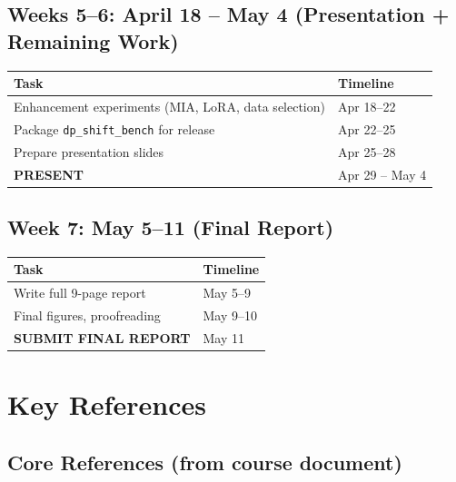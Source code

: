 \documentclass[11pt,a4paper]{article}
\begin{document}
\subsection{Weeks 5--6: April 18 -- May 4 (Presentation + Remaining Work)}

\begin{small}
\begin{longtable}{@{}p{7cm}p{5cm}@{}}
\toprule
\textbf{Task} & \textbf{Timeline} \\
\midrule
\endhead
Enhancement experiments (MIA, LoRA, data selection) & Apr 18--22 \\
Package \texttt{dp\_shift\_bench} for release & Apr 22--25 \\
Prepare presentation slides & Apr 25--28 \\
\textbf{PRESENT} & Apr 29 -- May 4 \\
\bottomrule
\end{longtable}
\end{small}

\subsection{Week 7: May 5--11 (Final Report)}

\begin{small}
\begin{longtable}{@{}p{7cm}p{5cm}@{}}
\toprule
\textbf{Task} & \textbf{Timeline} \\
\midrule
\endhead
Write full 9-page report & May 5--9 \\
Final figures, proofreading & May 9--10 \\
\textbf{SUBMIT FINAL REPORT} & May 11 \\
\bottomrule
\end{longtable}
\end{small}

\section{Key References}

\subsection{Core References (from course document)}
\end{document}

